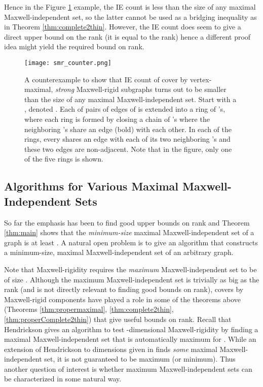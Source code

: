 \documentclass[10pt]{article}
\begin{document}
\medskip\noindent 
Hence in the Figure \ref{smr_counter} example, the IE count is less than the size of any maximal Maxwell-independent set, so the latter cannot be used as a bridging inequality
as in Theorem \ref{thm:complete2thin}.
However, the IE count does seem to give a direct upper bound on the rank (it is equal to the rank) hence a different proof idea might yield the required bound on rank.
\begin{center}
\begin{figure}[!h]
\begin{center}
\texttt{[image: smr\_counter.png]}
\end{center}
\caption[A counterexample to show that IE count of cover  by vertex-maximal, {\em strong} Maxwell-rigid subgraphs turns out to be smaller than the size of any maximal Maxwell-independent set.]{A counterexample to show that IE count of cover  by vertex-maximal, {\em strong} Maxwell-rigid subgraphs turns out to be smaller than the size of any maximal Maxwell-independent set.
Start with a , denoted . Each of  pairs of edges of  is extended into a ring of  's, where each ring is formed by closing a chain of 's where the neighboring 's share an edge (bold) with each other. In each
of the  rings, every  shares an edge with each of its two neighboring 's and these two edges are non-adjacent. Note that in the figure, only one of the five rings is shown.}
\label{smr_counter}
\end{figure}
\end{center}

\subsection{Algorithms for Various Maximal Maxwell-Independent Sets}
So far the emphasis has been to find good upper bounds on rank and Theorem \ref{thm:main} shows that the {\it minimum-size} maximal Maxwell-independent set of a graph  is at least . A natural open problem is to give an algorithm that constructs a minimum-size,
maximal Maxwell-independent set of an arbitrary graph.

\medskip\noindent
Note that Maxwell-rigidity requires the {\it maximum} Maxwell-independent set to be of size . Although the maximum Maxwell-independent set is trivially as big as the rank (and is not directly relevant to finding good bounds on rank), covers by Maxwell-rigid components have played a role in some of the theorems above (Theorems \ref{thm:propermaximal}, \ref{thm:complete2thin}, \ref{thm:properComplete2thin}) that give useful bounds on rank. Recall that Hendrickson \cite{Hendrickson92conditionsfor} gives an algorithm to test -dimensional Maxwell-rigidity by finding a maximal Maxwell-independent set that is automatically maximum for . While an extension of Hendrickson \cite{Hendrickson92conditionsfor} to  dimensions given in \cite{andrewThesis} finds {\em some} maximal Maxwell-independent set, it is not guaranteed to be maximum (or minimum). Thus another question of interest is whether maximum Maxwell-independent sets can be characterized in some natural way.
\end{document}
